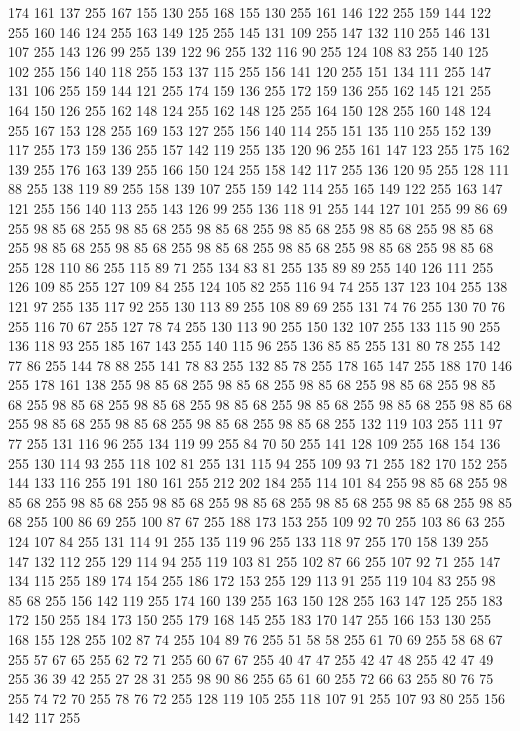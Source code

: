 174 161 137 255 167 155 130 255 168 155 130 255 161 146 122 255 159 144 122 255 160 146 124 255 163 149 125 255 145 131 109 255 147 132 110 255 146 131 107 255 143 126 99 255 139 122 96 255 132 116 90 255 124 108 83 255 140 125 102 255 156 140 118 255 153 137 115 255 156 141 120 255 151 134 111 255 147 131 106 255 159 144 121 255 174 159 136 255 172 159 136 255 162 145 121 255 164 150 126 255 162 148 124 255 162 148 125 255 164 150 128 255 160 148 124 255 167 153 128 255 169 153 127 255 156 140 114 255 151 135 110 255 152 139 117 255 173 159 136 255 157 142 119 255 135 120 96 255 161 147 123 255 175 162 139 255 176 163 139 255 166 150 124 255 158 142 117 255 136 120 95 255 128 111 88 255 138 119 89 255 158 139 107 255 159 142 114 255 165 149 122 255 163 147 121 255 156 140 113 255 143 126 99 255 136 118 91 255 144 127 101 255 99 86 69 255 98 85 68 255 98 85 68 255 98 85 68 255 98 85 68 255 98 85 68 255 98 85 68 255 98 85 68 255 98 85 68 255 98 85 68 255 98 85 68 255
98 85 68 255 98 85 68 255 128 110 86 255 115 89 71 255 134 83 81 255 135 89 89 255 140 126 111 255 126 109 85 255 127 109 84 255 124 105 82 255 116 94 74 255 137 123 104 255 138 121 97 255 135 117 92 255 130 113 89 255 108 89 69 255 131 74 76 255 130 70 76 255 116 70 67 255 127 78 74 255 130 113 90 255 150 132 107 255 133 115 90 255 136 118 93 255 185 167 143 255 140 115 96 255 136 85 85 255 131 80 78 255 142 77 86 255 144 78 88 255 141 78 83 255 132 85 78 255 178 165 147 255 188 170 146 255 178 161 138 255 98 85 68 255 98 85 68 255 98 85 68 255 98 85 68 255 98 85 68 255 98 85 68 255 98 85 68 255 98 85 68 255 98 85 68 255 98 85 68 255 98 85 68 255 98 85 68 255 98 85 68 255 98 85 68 255 98 85 68 255 132 119 103 255 111 97 77 255 131 116 96 255 134 119 99 255 84 70 50 255 141 128 109 255 168 154 136 255 130 114 93 255 118 102 81 255 131 115 94 255 109 93 71 255 182 170 152 255 144 133 116 255 191 180 161 255
212 202 184 255 114 101 84 255 98 85 68 255 98 85 68 255 98 85 68 255 98 85 68 255 98 85 68 255 98 85 68 255 98 85 68 255 98 85 68 255 100 86 69 255 100 87 67 255 188 173 153 255 109 92 70 255 103 86 63 255 124 107 84 255 131 114 91 255 135 119 96 255 133 118 97 255 170 158 139 255 147 132 112 255 129 114 94 255 119 103 81 255 102 87 66 255 107 92 71 255 147 134 115 255 189 174 154 255 186 172 153 255 129 113 91 255 119 104 83 255 98 85 68 255 156 142 119 255 174 160 139 255 163 150 128 255 163 147 125 255 183 172 150 255 184 173 150 255 179 168 145 255 183 170 147 255 166 153 130 255 168 155 128 255 102 87 74 255 104 89 76 255 51 58 58 255 61 70 69 255 58 68 67 255 57 67 65 255 62 72 71 255 60 67 67 255 40 47 47 255 42 47 48 255 42 47 49 255 36 39 42 255 27 28 31 255 98 90 86 255 65 61 60 255 72 66 63 255 80 76 75 255 74 72 70 255 78 76 72 255 128 119 105 255 118 107 91 255 107 93 80 255 156 142 117 255
